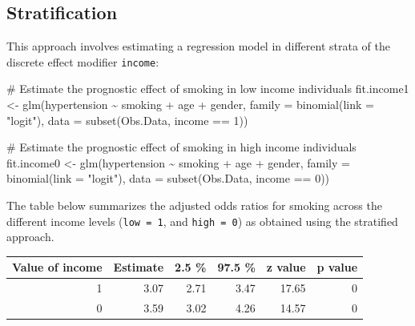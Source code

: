 \documentclass[
  letterpaper,
  DIV=11,
  numbers=noendperiod]{scrreprt}
\newenvironment{Shaded}{\begin{snugshade}}{\end{snugshade}}
\newcommand{\AttributeTok}[1]{\textcolor[rgb]{0.40,0.45,0.13}{#1}}
\newcommand{\CommentTok}[1]{\textcolor[rgb]{0.37,0.37,0.37}{#1}}
\newcommand{\DecValTok}[1]{\textcolor[rgb]{0.68,0.00,0.00}{#1}}
\newcommand{\FunctionTok}[1]{\textcolor[rgb]{0.28,0.35,0.67}{#1}}
\newcommand{\NormalTok}[1]{\textcolor[rgb]{0.00,0.23,0.31}{#1}}
\newcommand{\OtherTok}[1]{\textcolor[rgb]{0.00,0.23,0.31}{#1}}
\newcommand{\SpecialCharTok}[1]{\textcolor[rgb]{0.37,0.37,0.37}{#1}}
\newcommand{\StringTok}[1]{\textcolor[rgb]{0.13,0.47,0.30}{#1}}
\begin{document}
\hypertarget{stratification}{%
\subsection{Stratification}\label{stratification}}

This approach involves estimating a regression model in different strata
of the discrete effect modifier \texttt{income}:

\begin{Shaded}
\begin{Highlighting}[]
\CommentTok{\# Estimate the prognostic effect of smoking in low income individuals}
\NormalTok{fit.income1 }\OtherTok{\textless{}{-}} \FunctionTok{glm}\NormalTok{(hypertension }\SpecialCharTok{\textasciitilde{}}\NormalTok{ smoking }\SpecialCharTok{+}\NormalTok{ age }\SpecialCharTok{+}\NormalTok{ gender, }
            \AttributeTok{family =} \FunctionTok{binomial}\NormalTok{(}\AttributeTok{link =} \StringTok{"logit"}\NormalTok{), }
            \AttributeTok{data =} \FunctionTok{subset}\NormalTok{(Obs.Data, income }\SpecialCharTok{==} \DecValTok{1}\NormalTok{))}

\CommentTok{\# Estimate the prognostic effect of smoking in high income individuals}
\NormalTok{fit.income0 }\OtherTok{\textless{}{-}} \FunctionTok{glm}\NormalTok{(hypertension }\SpecialCharTok{\textasciitilde{}}\NormalTok{ smoking }\SpecialCharTok{+}\NormalTok{ age }\SpecialCharTok{+}\NormalTok{ gender, }
            \AttributeTok{family =} \FunctionTok{binomial}\NormalTok{(}\AttributeTok{link =} \StringTok{"logit"}\NormalTok{), }
            \AttributeTok{data =} \FunctionTok{subset}\NormalTok{(Obs.Data, income }\SpecialCharTok{==} \DecValTok{0}\NormalTok{))}
\end{Highlighting}
\end{Shaded}

The table below summarizes the adjusted odds ratios for smoking across
the different income levels (\texttt{low\ =\ 1}, and
\texttt{high\ =\ 0}) as obtained using the stratified approach.

\begin{table}[!h]
\centering
\begin{tabular}{rrrrrr}
\toprule
Value of income & Estimate & 2.5 \% & 97.5 \% & z value & p value\\
\midrule
1 & 3.07 & 2.71 & 3.47 & 17.65 & 0\\
0 & 3.59 & 3.02 & 4.26 & 14.57 & 0\\
\bottomrule
\end{tabular}
\end{table}
\end{document}
